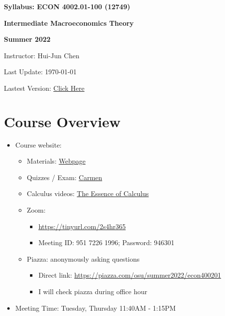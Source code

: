 \documentclass[12pt]{article}
\begin{document}
\centerline{\huge\bf Syllabus: ECON 4002.01-100 (12749)}
\medskip
\centerline{\LARGE \bf Intermediate Macroeconomics Theory}
\medskip
\centerline{\LARGE \bf Summer 2022}
\medskip
\centerline{\Large Instructor: Hui-Jun Chen}
\centerline{Last Update: \today}
\centerline{Lastest Version: \href{https://huijunchen9260.github.io/pdf/IntermediateMacroSummer2022/syllabus/build/syllabus.pdf}{Click Here}}

\medskip

\section*{Course Overview}
\begin{itemize}

    \item Course website:
    \begin{itemize}
        \item Materials: \href{https://huijunchen9260.github.io/IntermediateMacroSummer2022.html}{Webpage}
        \item Quizzes / Exam: \href{https://osu.instructure.com/courses/121985}{Carmen}
        \item Calculus videos: \href{https://www.youtube.com/watch?v=WUvTyaaNkzM&list=PLZHQObOWTQDMsr9K-rj53DwVRMYO3t5Yr}{The Essence of Calculus}
        \item Zoom:
        \begin{itemize}
            \item \href{https://tinyurl.com/2s4hr365}{https://tinyurl.com/2s4hr365}
            \item Meeting ID: 951 7226 1996; Password: 946301
        \end{itemize}
        \item Piazza: anonymously asking questions
        \begin{itemize}
            \item Direct link: \href{https://piazza.com/osu/summer2022/econ400201}{https://piazza.com/osu/summer2022/econ400201}
            \item I will check piazza during office hour
        \end{itemize}
    \end{itemize}
    \item Meeting Time: Tuesday, Thursday 11:40AM - 1:15PM

\end{itemize}
\end{document}
